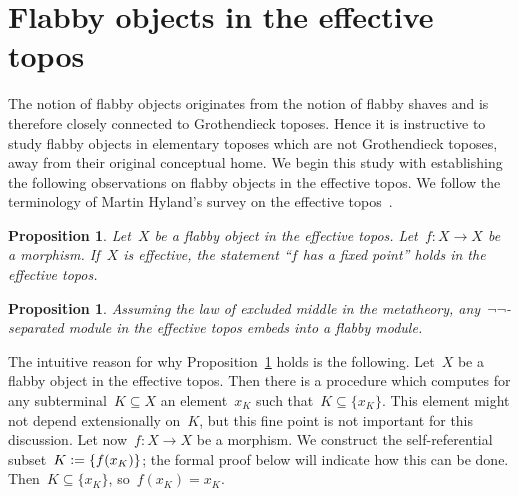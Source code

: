 \documentclass[oneside]{amsart}
\theoremstyle{definition}
\theoremstyle{plain}
\newtheorem{prop}[defn]{Proposition}
\theoremstyle{remark}
\newcommand{\defeq}{\vcentcolon=}
\renewcommand{\_}{\mathpunct{.}\,}
\newcommand{\effective}{ef{}fective\xspace}
\begin{document}
\section{Flabby objects in the \effective topos}
\label{sect:in-eff}

The notion of flabby objects originates from the notion of flabby shaves and is
therefore closely connected to Grothendieck toposes. Hence it is instructive
to study flabby objects in elementary toposes which are not Grothendieck
toposes, away from their original conceptual home. We begin this study with
establishing the following observations on flabby objects in the \effective
topos. We follow the terminology of Martin Hyland's survey on the \effective
topos~\cite{hyland:effective-topos}.

\begin{prop}\label{prop:flabby-effective-sets}
Let~$X$ be a flabby object in the \effective topos. Let~$f : X \to X$
be a morphism. If~$X$ is \effective, the statement ``$f$ has a fixed point''
holds in the \effective topos.
\end{prop}

\begin{prop}\label{prop:semienough-flabby-modules}
Assuming the law of excluded middle in the metatheory, any~$\neg\neg$-separated
module in the \effective topos embeds into a flabby module.
\end{prop}



The intuitive
reason for why Proposition~\ref{prop:flabby-effective-sets} holds is the
following. Let~$X$ be a flabby object in the \effective topos. Then there is a
procedure which computes for any subterminal~$K \subseteq X$ an element~$x_K$
such that~$K \subseteq \{ x_K \}$. This element might not depend extensionally
on~$K$, but this fine point is not important for this discussion. Let
now~$f : X \to X$ be a morphism. We construct the self-referential subset~$K
\defeq \{ f(x_K) \}$; the formal proof below will indicate how this can be
done. Then~$K \subseteq \{ x_K \}$, so~$f(x_K) = x_K$.
\end{document}
